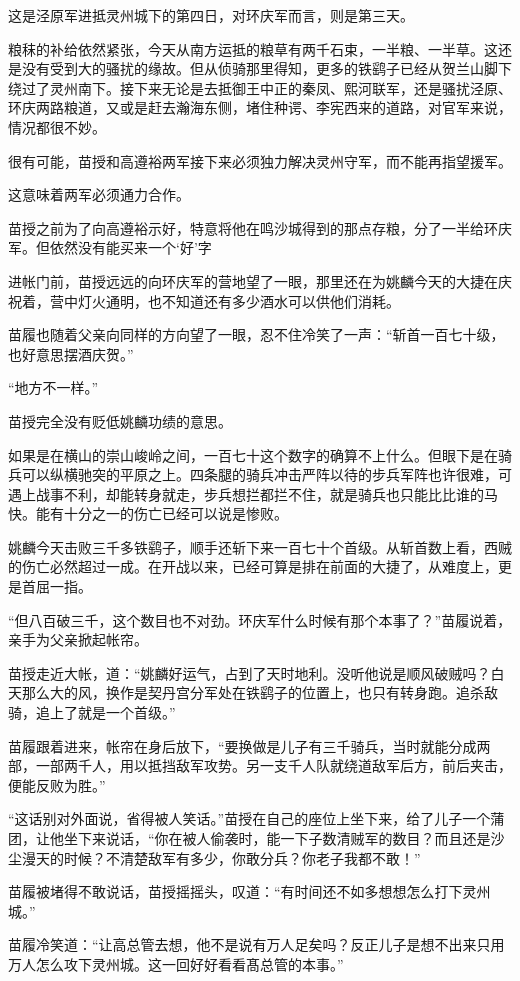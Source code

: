 这是泾原军进抵灵州城下的第四日，对环庆军而言，则是第三天。

粮秣的补给依然紧张，今天从南方运抵的粮草有两千石束，一半粮、一半草。这还是没有受到大的骚扰的缘故。但从侦骑那里得知，更多的铁鹞子已经从贺兰山脚下绕过了灵州南下。接下来无论是去抵御王中正的秦凤、熙河联军，还是骚扰泾原、环庆两路粮道，又或是赶去瀚海东侧，堵住种谔、李宪西来的道路，对官军来说，情况都很不妙。

很有可能，苗授和高遵裕两军接下来必须独力解决灵州守军，而不能再指望援军。

这意味着两军必须通力合作。

苗授之前为了向高遵裕示好，特意将他在鸣沙城得到的那点存粮，分了一半给环庆军。但依然没有能买来一个‘好’字

进帐门前，苗授远远的向环庆军的营地望了一眼，那里还在为姚麟今天的大捷在庆祝着，营中灯火通明，也不知道还有多少酒水可以供他们消耗。

苗履也随着父亲向同样的方向望了一眼，忍不住冷笑了一声：“斩首一百七十级，也好意思摆酒庆贺。”

“地方不一样。”

苗授完全没有贬低姚麟功绩的意思。

如果是在横山的崇山峻岭之间，一百七十这个数字的确算不上什么。但眼下是在骑兵可以纵横驰突的平原之上。四条腿的骑兵冲击严阵以待的步兵军阵也许很难，可遇上战事不利，却能转身就走，步兵想拦都拦不住，就是骑兵也只能比比谁的马快。能有十分之一的伤亡已经可以说是惨败。

姚麟今天击败三千多铁鹞子，顺手还斩下来一百七十个首级。从斩首数上看，西贼的伤亡必然超过一成。在开战以来，已经可算是排在前面的大捷了，从难度上，更是首屈一指。

“但八百破三千，这个数目也不对劲。环庆军什么时候有那个本事了？”苗履说着，亲手为父亲掀起帐帘。

苗授走近大帐，道：“姚麟好运气，占到了天时地利。没听他说是顺风破贼吗？白天那么大的风，换作是契丹宫分军处在铁鹞子的位置上，也只有转身跑。追杀敌骑，追上了就是一个首级。”

苗履跟着进来，帐帘在身后放下，“要换做是儿子有三千骑兵，当时就能分成两部，一部两千人，用以抵挡敌军攻势。另一支千人队就绕道敌军后方，前后夹击，便能反败为胜。”

“这话别对外面说，省得被人笑话。”苗授在自己的座位上坐下来，给了儿子一个蒲团，让他坐下来说话，“你在被人偷袭时，能一下子数清贼军的数目？而且还是沙尘漫天的时候？不清楚敌军有多少，你敢分兵？你老子我都不敢！”

苗履被堵得不敢说话，苗授摇摇头，叹道：“有时间还不如多想想怎么打下灵州城。”

苗履冷笑道：“让高总管去想，他不是说有万人足矣吗？反正儿子是想不出来只用万人怎么攻下灵州城。这一回好好看看髙总管的本事。”

